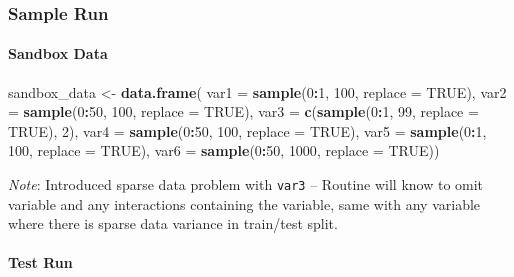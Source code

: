 \documentclass[
]{article}
\newenvironment{Shaded}{\begin{snugshade}}{\end{snugshade}}
\newcommand{\AttributeTok}[1]{\textcolor[rgb]{0.13,0.29,0.53}{#1}}
\newcommand{\ConstantTok}[1]{\textcolor[rgb]{0.56,0.35,0.01}{#1}}
\newcommand{\DecValTok}[1]{\textcolor[rgb]{0.00,0.00,0.81}{#1}}
\newcommand{\FunctionTok}[1]{\textcolor[rgb]{0.13,0.29,0.53}{\textbf{#1}}}
\newcommand{\NormalTok}[1]{#1}
\newcommand{\OtherTok}[1]{\textcolor[rgb]{0.56,0.35,0.01}{#1}}
\newcommand{\SpecialCharTok}[1]{\textcolor[rgb]{0.81,0.36,0.00}{\textbf{#1}}}
\begin{document}
\hypertarget{sample-run}{%
\subsubsection{\texorpdfstring{\textbf{Sample
Run}}{Sample Run}}\label{sample-run}}

\hypertarget{sandbox-data}{%
\paragraph{\texorpdfstring{\textbf{Sandbox
Data}}{Sandbox Data}}\label{sandbox-data}}

\begin{Shaded}
\begin{Highlighting}[]
\NormalTok{sandbox\_data }\OtherTok{\textless{}{-}} \FunctionTok{data.frame}\NormalTok{(}
  \AttributeTok{var1 =} \FunctionTok{sample}\NormalTok{(}\DecValTok{0}\SpecialCharTok{:}\DecValTok{1}\NormalTok{, }\DecValTok{100}\NormalTok{, }\AttributeTok{replace =} \ConstantTok{TRUE}\NormalTok{),}
  \AttributeTok{var2 =} \FunctionTok{sample}\NormalTok{(}\DecValTok{0}\SpecialCharTok{:}\DecValTok{50}\NormalTok{, }\DecValTok{100}\NormalTok{, }\AttributeTok{replace =} \ConstantTok{TRUE}\NormalTok{),}
  \AttributeTok{var3 =} \FunctionTok{c}\NormalTok{(}\FunctionTok{sample}\NormalTok{(}\DecValTok{0}\SpecialCharTok{:}\DecValTok{1}\NormalTok{, }\DecValTok{99}\NormalTok{, }\AttributeTok{replace =} \ConstantTok{TRUE}\NormalTok{), }\DecValTok{2}\NormalTok{),}
  \AttributeTok{var4 =} \FunctionTok{sample}\NormalTok{(}\DecValTok{0}\SpecialCharTok{:}\DecValTok{50}\NormalTok{, }\DecValTok{100}\NormalTok{, }\AttributeTok{replace =} \ConstantTok{TRUE}\NormalTok{),}
  \AttributeTok{var5 =} \FunctionTok{sample}\NormalTok{(}\DecValTok{0}\SpecialCharTok{:}\DecValTok{1}\NormalTok{, }\DecValTok{100}\NormalTok{, }\AttributeTok{replace =} \ConstantTok{TRUE}\NormalTok{),}
  \AttributeTok{var6 =} \FunctionTok{sample}\NormalTok{(}\DecValTok{0}\SpecialCharTok{:}\DecValTok{50}\NormalTok{, }\DecValTok{1000}\NormalTok{, }\AttributeTok{replace =} \ConstantTok{TRUE}\NormalTok{))}
\end{Highlighting}
\end{Shaded}

\emph{Note}: Introduced sparse data problem with \texttt{var3} --
Routine will know to omit variable and any interactions containing the
variable, same with any variable where there is sparse data variance in
train/test split.

\hypertarget{test-run}{%
\paragraph{\texorpdfstring{\textbf{Test
Run}}{Test Run}}\label{test-run}}
\end{document}
